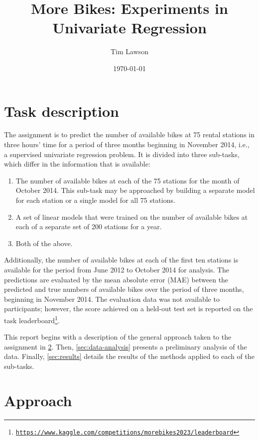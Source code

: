 \documentclass[11pt]{extarticle}
\begin{document}
\title{More Bikes: Experiments in Univariate Regression}
\author{Tim Lawson}
\date{\today}

\maketitle

\section{Task description}

The assignment is to predict the number of available bikes at 75 rental stations in
three hours' time for a period of three months beginning in November 2014, i.e., a
supervised univariate regression problem.
It is divided into three sub-tasks, which differ in the information that is available:
\begin{enumerate}
  \item The number of available bikes at each of the 75 stations for the month of October 2014.
        This sub-task may be approached by building a separate model for each station or a
        single model for all 75 stations.
  \item A set of linear models that were trained on the number of available bikes at each of a
        separate set of 200 stations for a year.
  \item Both of the above.
\end{enumerate}
Additionally, the number of available bikes at each of the first ten stations is
available for the period from June 2012 to October 2014 for analysis.
The predictions are evaluated by the mean absolute error (MAE) between the predicted
and true numbers of available bikes over the period of three months, beginning in
November 2014.
The evaluation data was not available to participants; however, the score achieved on a
held-out test set is reported on the task
leaderboard\footnote{\href{https://www.kaggle.com/competitions/morebikes2023/leaderboard}{\texttt{https://www.kaggle.com/competitions/morebikes2023/leaderboard}}}.

This report begins with a description of the general approach taken to the assignment in \cref{sec:approach}.
Then, \cref{sec:data-analysis} presents a preliminary analysis of the data.
Finally, \cref{sec:results} details the results of the methods applied to each of the sub-tasks.

\section{Approach}
\label{sec:approach}
\end{document}

